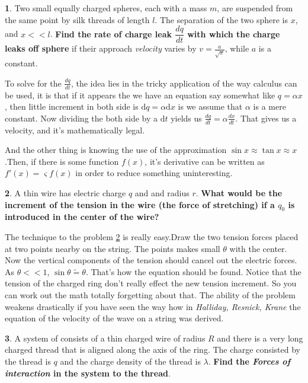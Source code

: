 \documentclass[11pt,a4paper,twocolumn,openright]{article}
\theoremstyle{definition}
\theoremstyle{definition}
\newtheorem{pr}{ \framebox[0.05\textwidth]{{\sffamily Pr}} }
\theoremstyle{definition}
\theoremstyle{definition}
\begin{document}
\begin{pr} \label{pr1}
Two small equally charged spheres, each with a mass $m$, are suspended from the same point by silk threads of length $l$. The separation of the two sphere is $x$, and $x < < l$. \textbf{Find the rate of charge leak $\dfrac{dq}{dt}$ with which the charge leaks off sphere} if their approach \emph{velocity} varies by $v=\frac{a}{\sqrt{x}}$, while $a$ is a constant.
\end{pr}
{\small
To solve for the $\frac{dq}{dt}$, the idea lies in the tricky application of the way calculus can be used, it is that if it appears the we have an equation say somewhat like $ q = \alpha x $, then little increment in both side is $ \mathrm{d}q = \alpha \mathrm{d}x $ is we assume that $\alpha$ is a mere constant. Now dividing the both side by a $\mathrm{d}t$ yields us $\frac{dq}{dt} = \alpha \frac{dx}{dt} $. That gives us a velocity, and it's mathematically legal. 

And the other thing is knowing the use of the approximation $\sin x \approx \tan x \approx x $.Then, if there is some function $f(x)$, it's derivative can be written as $f'(x) = \varsigma f(x) $ in order to reduce something uninteresting.}

\begin{pr} \label{pr2}
A thin wire has electric charge $q$ and and radius $r$. \textbf{What would be the increment of the tension in the wire (the force of stretching) if a $q_0$ is introduced in the center of the wire?}
\end{pr}

{\small The technique to the problem \ref{pr2} is really easy.Draw the two tension forces placed at two points nearby on the string. The points makes small $\theta$ with the center. Now the vertical components of the tension should cancel out the electric forces. As $\theta << 1$, $\sin \theta \tilde{=} \theta $. That's how the equation should be found. Notice that the tension of the charged ring don't really effect the new tension increment. So you can work out the math totally forgetting about that. The ability of the problem weakens drastically if you have seen the way how in \emph{Halliday, Resnick, Krane} the equation of the velocity of the wave on a string was derived.}


\begin{pr} \label{pr3}
A system of consists of a thin charged wire of radius $R$ and there is a very long charged thread that is aligned along the axis of the ring. The charge consisted by the thread is $q$ and the charge density of the thread is $\lambda$. \textbf{Find the \emph{Forces of interaction} in the system to the thread}.
\end{pr}
\end{document}
